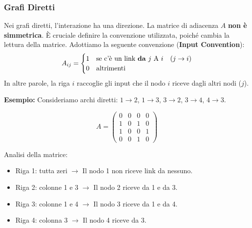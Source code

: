 \newpage
\subsubsection{\textcolor{colorA}{Grafi Diretti}}
Nei grafi diretti, l'interazione ha una direzione. La matrice di adiacenza $A$ \textbf{non è simmetrica}.
È cruciale definire la convenzione utilizzata, poiché cambia la lettura della matrice. Adottiamo la seguente convenzione (\textbf{Input Convention}):
\begin{equation}
A_{ij} = 
\begin{cases} 
1 & \text{se c'è un link \textbf{da} } j \text{ A } i \quad (j \to i) \\
0 & \text{altrimenti}
\end{cases}
\end{equation}
In altre parole, la riga $i$ raccoglie gli input che il nodo $i$ riceve dagli altri nodi ($j$).

\noindent \textbf{Esempio:} 
Consideriamo archi diretti: $1 \to 2$, $1 \to 3$, $3 \to 2$, $3 \to 4$, $4 \to 3$.

\hfill 

\noindent
\begin{minipage}{0.35\textwidth}
\begin{equation*}
A = 
\begin{pmatrix} 
0 & 0 & 0 & 0 \\ 
1 & 0 & 1 & 0 \\ 
1 & 0 & 0 & 1 \\ 
0 & 0 & 1 & 0 
\end{pmatrix}
\end{equation*}

\end{minipage}%
\hfill
\begin{minipage}{0.55\textwidth}
\centering
{}
\end{minipage}

\hfill

\noindent Analisi della matrice:
\begin{itemize}
    \item Riga 1: tutta zeri $\rightarrow$ Il nodo 1 non riceve link da nessuno.
    \item Riga 2: colonne 1 e 3 $\rightarrow$ Il nodo 2 riceve da 1 e da 3.
    \item Riga 3: colonne 1 e 4 $\rightarrow$ Il nodo 3 riceve da 1 e da 4.
    \item Riga 4: colonna 3 $\rightarrow$ Il nodo 4 riceve da 3.
\end{itemize}


